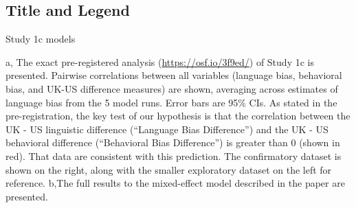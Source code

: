 \documentclass[]{article}
\begin{document}
\hypertarget{title-and-legend}{%
\subsection{Title and Legend}\label{title-and-legend}}

Study 1c models

a, The exact pre-registered analysis (\url{https://osf.io/3f9ed/}) of Study 1c is presented. Pairwise correlations between all variables
(language bias, behavioral bias, and UK-US difference measures) are shown, averaging across estimates of language bias from the 5 model runs. Error bars are 95\% CIs. As stated in the pre-registration, the key test of our hypothesis is that the correlation between the UK - US linguistic difference (``Language Bias Difference'') and the UK - US behavioral difference (``Behavioral Bias Difference'') is greater than 0 (shown in red). That data are consistent with this prediction. The confirmatory dataset is shown on the right, along with the smaller exploratory dataset on the left for reference. b,The full results to the mixed-effect model described in the paper are presented.
\end{document}
